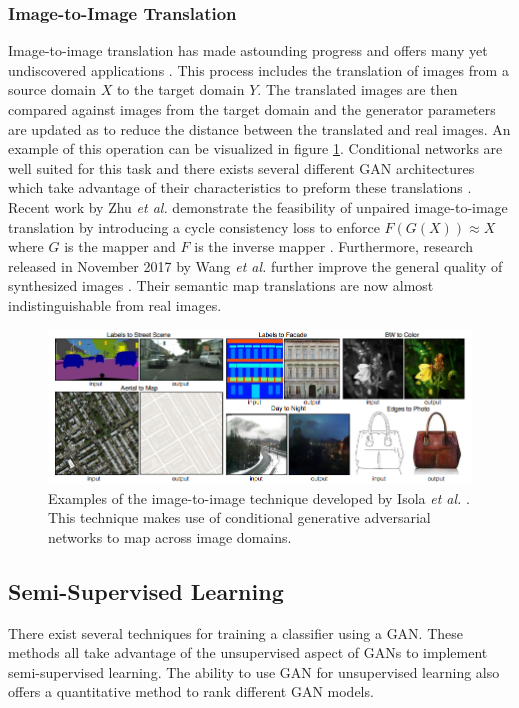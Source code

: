 \documentclass[11pt]{article}
\begin{document}
\subsubsection{Image-to-Image Translation}
Image-to-image translation has made astounding progress and offers many yet undiscovered applications \citep{2017arXiv170100160G}. This process includes the translation of images from a source domain $X$ to the target domain $Y$. The translated images are then compared against images from the target domain and the generator parameters are updated as to reduce the distance between the translated and real images. An example of this operation can be visualized in figure \ref{fig:img2img}. Conditional networks are well suited for this task and there exists several different GAN architectures which take advantage of their characteristics to preform these translations \citep{2016arXiv161107004I, 2017arXiv171111585W, 2017arXiv170310593Z}. Recent work by Zhu \textit{et al.} demonstrate the feasibility of unpaired image-to-image translation by introducing a cycle consistency loss to enforce $F(G(X)) \approx X$ where $G$ is the mapper and $F$ is the inverse mapper \citep{2017arXiv170310593Z}. Furthermore, research released in November 2017 by Wang \textit{et al.} further improve the general quality of synthesized images \citep{2017arXiv171111585W}. Their semantic map translations are now almost indistinguishable from real images.

\begin{figure}
\centering
\includegraphics[scale=0.55]{img2img}
\caption{Examples of the image-to-image technique developed by Isola \textit{et al.} \citep{2016arXiv161107004I}. This technique makes use of conditional generative adversarial networks to map across image domains.}
\label{fig:img2img}
\end{figure}

\subsection{Semi-Supervised Learning} \label{sec:semisupervised}
There exist several techniques for training a classifier using a GAN. These methods all take advantage of the unsupervised aspect of GANs to implement semi-supervised learning. The ability to use GAN for unsupervised learning also offers a quantitative method to rank different GAN models.
\end{document}
